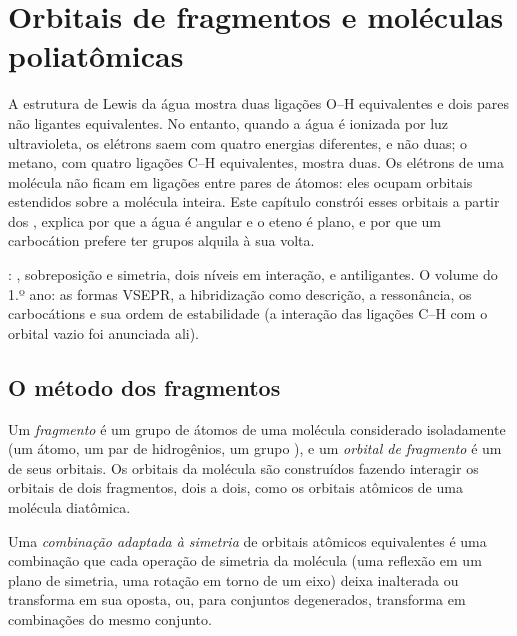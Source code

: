 \chapter{Orbitais de fragmentos e moléculas poliatômicas}\label{ch:b2:fragment-orbitals}

A estrutura de Lewis da água mostra duas ligações O--H equivalentes e dois
pares não ligantes equivalentes. No entanto, quando a água é ionizada por luz
ultravioleta, os elétrons saem com quatro energias diferentes, e não duas; o
metano, com quatro ligações C--H equivalentes, mostra duas. Os elétrons de uma
molécula não ficam em ligações entre pares de átomos: eles ocupam orbitais
estendidos sobre a molécula inteira. Este capítulo constrói esses orbitais a
partir dos , explica por que a água é angular e o eteno
é plano, e por que um carbocátion prefere ter grupos alquila à sua volta.

\begin{recall}
: , sobreposição e simetria, dois níveis em
interação,  e antiligantes. O volume do 1.º ano: as formas
VSEPR, a hibridização como descrição, a ressonância, os carbocátions e sua
ordem de estabilidade (a interação das ligações C--H com o orbital vazio foi
anunciada ali).
\end{recall}

\section{O método dos fragmentos}

\begin{definition}[Fragmentos]\label{def:b2:fragment-orbitals:fragment}
Um \emph{fragmento} é um grupo de átomos de uma molécula
considerado isoladamente (um átomo, um par de hidrogênios, um grupo ), e
um \emph{orbital de fragmento} é um de seus orbitais.
Os orbitais da molécula são construídos fazendo interagir os orbitais de dois
fragmentos, dois a dois, como os orbitais atômicos de uma molécula diatômica.
\end{definition}

\begin{definition}\label{def:b2:fragment-orbitals:symmetry-adapted}
Uma \emph{combinação adaptada à simetria} de
orbitais atômicos equivalentes é uma combinação que cada operação de simetria
da molécula (uma reflexão em um plano de simetria, uma rotação em torno de um
eixo) deixa inalterada ou transforma em sua oposta, ou, para conjuntos
degenerados, transforma em combinações do mesmo conjunto.
\end{definition}

